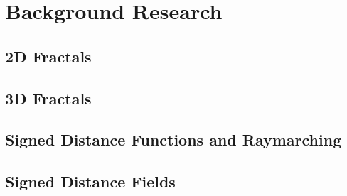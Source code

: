 \chapter{Background Research}
\label{chapter1}

\section{2D Fractals}
\lipsum[1-1] \cite{aron2009mandelbulb}

\section{3D Fractals}
\lipsum[1-1] \cite{aron2009mandelbulb}

\section{Signed Distance Functions and Raymarching}
\lipsum[1-1] \cite{aron2009mandelbulb}

\section{Signed Distance Fields}
\lipsum[1-1] \cite{aron2009mandelbulb}